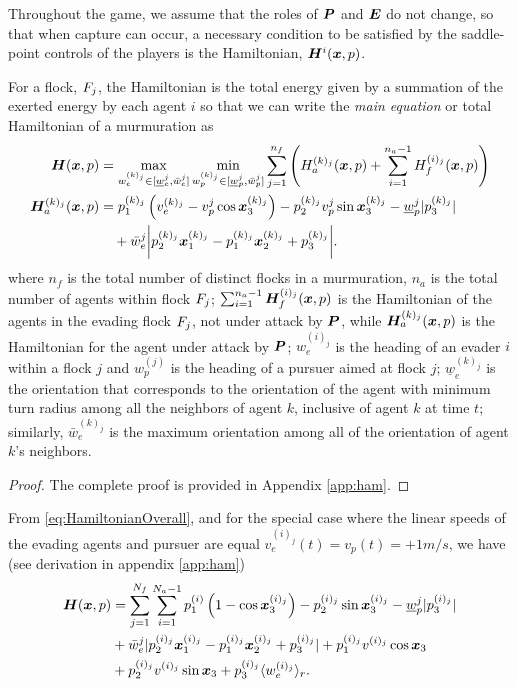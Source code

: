 Throughout the game, we assume that the roles of $\bm{P}$  and $\bm{E}$ do not change, so that when capture can occur, a necessary condition to be satisfied by the saddle-point controls of the players is the Hamiltonian, $\bm{H}^i(\bm{x}, p)$.  
%
\begin{theorem}
	For  a flock, $F_j$, the Hamiltonian is the total energy given by a summation of the exerted energy by each agent $i$ so that we can write the \textit{main equation} or total Hamiltonian of a murmuration as 
	\begin{align}
		\bm{H}(\bm{x}, p) &= \max_{w_e^{(k)_j} \in [\underline{w}_e^j, \bar{w}_e^j]}  \min_{w_p^{(k)_j}  \in [\underline{w}_p^{j}, \bar{w}_p^j]} \sum_{j=1}^{n_f} \left( H^{(k)_j}_a(\bm{x}, p) + \sum_{i=1}^{n_a-1} H^{(i)_j}_f(\bm{x}, p)  \right) \\
		\bm{H}^{(k)_j}_a(\bm{x}, p) &= p_1^{(k)_j} \left(v_e^{(k)_j} - v_p^{j} \cos \bm{x}_3^{(k)_j}\right) - p_2^{(k)_j} v_p^{j}  \sin \bm{x}_3^{(k)_j} - \underline{w}_p^j |p_3^{(k)_j}| \nonumber 	\\
			& \quad +  \bar{w}_e^j \bigg|p_2^{(k)_j} \bm{x}_1^{(k)_j} - p_1^{(k)_j}\bm{x}_2^{(k)_j} + p_3^{(k)_j}\bigg|.
		\label{eq:HamiltonianOverall}
	\end{align}
	where $n_f$ is the total number of distinct flocks in a murmuration, $n_a$ is the total number of agents within flock $F_j$; $\sum_{i=1}^{n_a-1} \bm{H}^{(i)_j}_f(\bm{x}, p)$ is the  Hamiltonian of the agents in the evading flock $F_j$, not under attack by $\bm{P}$, while $\bm{H}^{(k)_j}_a(\bm{x}, p)$ is the Hamiltonian for the agent under attack by $\bm{P}$;  $w_e^{(i)_j}$ is the heading of an evader $i$ within a flock $j$ and $w_p^{(j)}$ is the heading of a pursuer aimed at flock $j$; $\underline{w}_e^{(k)_j}$ is the orientation that corresponds to  the orientation of the agent with minimum turn radius among all the neighbors of agent $k$, inclusive of agent $k$ at time $t$; similarly, $\bar{w}_e^{(k)_j}$ is  the maximum orientation among all of the orientation of agent $k$'s neighbors. 
	\label{th:ham_sum}
\end{theorem}
%
\begin{proof}
	The complete proof is provided in Appendix \ref{app:ham}.
\end{proof}
%
From \eqref{eq:HamiltonianOverall}, and for the special case where the linear speeds of the evading agents and pursuer are equal \ie $v_e^{(i)_j}(t) = v_p(t) = +1 m/s$, we have (see derivation in appendix \ref{app:ham})
%
\begin{align}
	\bm{H}(\bm{x}, p) &= \sum_{j=1}^{N_f} \sum_{i=1}^{N_a-1} p_1^{(i)} \left(1 - \cos \bm{x}_3^{(i)_j}\right) - p_2^{(i)_j} \sin \bm{x}_3^{(i)_j} - \underline{w}_p^j | p_3^{(i)_j}  |
	\nonumber 	\\
	& 
	+ \bar{w}_e^j | p_2^{(i)_j} \bm{x}_1^{(i)_j} - p_1^{(i)_j}\bm{x}_2^{(i)_j} + p_3^{(i)_j}| +
	p_1^{(i)_j}v^{(i)_j} \cos \bm{x}_3 
	\nonumber 	\\
	&+ p_2^{(i)_j} v^{(i)_j} \sin \bm{x}_3 + p_3^{(i)_j} \langle w_e^{(i)_j}\rangle_r.
	\label{eq:HamiltonianCompletada}
\end{align}
%

